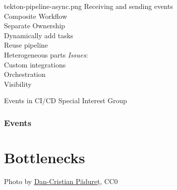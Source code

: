 \documentclass[aspectratio=169,11pt,hyperref={colorlinks=true}]{beamer}
\begin{document}
\begin{tpicstripedframe}%
  {tekton-pipeline-async.png}%
  {%
  Receiving and sending events \\
  \vspace{0.03\paperheight}
  Composite Workflow \\
  \vspace{0.03\paperheight}
  Separate Ownership \\
  }%
  {%
  Dynamically add tasks \\
  \vspace{0.03\paperheight}
  Reuse pipeline \\
  \vspace{0.03\paperheight}
  Heterogeneous parts
  }%
  {%
  \textit{Issues}: \\
  \vspace{0.03\paperheight}
  Custom integrations \\
  \vspace{0.03\paperheight}
  Orchestration \\
  Visibility
  \vspace{0.03\paperheight}
  }%
  {%
  Events in CI/CD Special Interest Group \\
  \vspace{0.05\paperheight}
  \centering
  
  }%
  \frametitle{Events}
\end{tpicstripedframe}

\section[Bottlenecks]{Bottlenecks}
\begin{sectionwithpicrx}{Photo by \href{https://unsplash.com/@dancristianp}{\underline{Dan-Cristian Pădureț}}, CC0}
\end{sectionwithpicrx}
\end{document}
